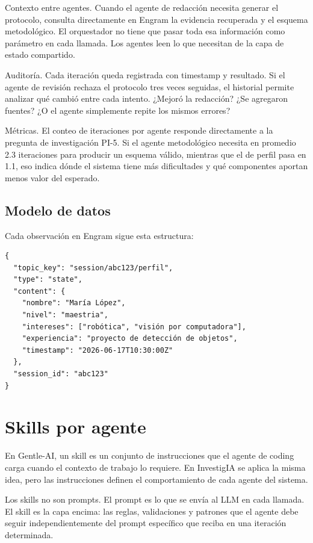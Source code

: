 \documentclass[12pt, a4paper]{article}
\begin{document}
Contexto entre agentes. Cuando el agente de redacción necesita generar el
protocolo, consulta directamente en Engram la evidencia recuperada y el
esquema metodológico. El orquestador no tiene que pasar toda esa
información como parámetro en cada llamada. Los agentes leen lo que
necesitan de la capa de estado compartido.

Auditoría. Cada iteración queda registrada con timestamp y resultado.
Si el agente de revisión rechaza el protocolo tres veces seguidas, el
historial permite analizar qué cambió entre cada intento. ¿Mejoró la
redacción? ¿Se agregaron fuentes? ¿O el agente simplemente repite los
mismos errores?

Métricas. El conteo de iteraciones por agente responde directamente a la
pregunta de investigación PI-5. Si el agente metodológico necesita en
promedio 2.3 iteraciones para producir un esquema válido, mientras que
el de perfil pasa en 1.1, eso indica dónde el sistema tiene más
dificultades y qué componentes aportan menos valor del esperado.

\newpage
\subsection{Modelo de datos}

Cada observación en Engram sigue esta estructura:

\begin{lstlisting}[style=json]
{
  "topic_key": "session/abc123/perfil",
  "type": "state",
  "content": {
    "nombre": "María López",
    "nivel": "maestria",
    "intereses": ["robótica", "visión por computadora"],
    "experiencia": "proyecto de detección de objetos",
    "timestamp": "2026-06-17T10:30:00Z"
  },
  "session_id": "abc123"
}
\end{lstlisting}

\section{Skills por agente}

En Gentle-AI, un skill es un conjunto de instrucciones que el agente de
coding carga cuando el contexto de trabajo lo requiere. En InvestigIA se
aplica la misma idea, pero las instrucciones definen el comportamiento de
cada agente del sistema.

Los skills no son prompts. El prompt es lo que se envía al LLM en cada
llamada. El skill es la capa encima: las reglas, validaciones y patrones
que el agente debe seguir independientemente del prompt específico que
reciba en una iteración determinada.
\end{document}

